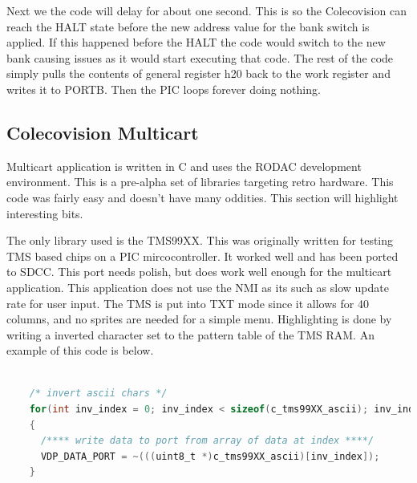\documentclass{article}
\begin{document}
  \par
  Next we the code will delay for about one second. This is so the Colecovision can reach the HALT state before the new address value for the
  bank switch is applied. If this happened before the HALT the code would switch to the new bank causing issues as it would start executing
  that code. The rest of the code simply pulls the contents of general register h20 back to the work register and writes it to PORTB. Then
  the PIC loops forever doing nothing.

  \subsection{Colecovision Multicart} \label{Colecovision Multicart}

  \par
  Multicart application is written in C and uses the RODAC development environment. This is a pre-alpha set of libraries targeting retro hardware.
  This code was fairly easy and doesn't have many oddities. This section will highlight interesting bits.

  \par
  The only library used is the TMS99XX. This was originally written for testing TMS based chips on a PIC mircocontroller. It worked well and has been
  ported to SDCC. This port needs polish, but does work well enough for the multicart application. This application does not use the NMI as its such
  as slow update rate for user input. The TMS is put into TXT mode since it allows for 40 columns, and no sprites are needed for a simple menu.
  Highlighting is done by writing a inverted character set to the pattern table of the TMS RAM. An example of this code is below.

  \begin{lstlisting}[language=C]

    /* invert ascii chars */
    for(int inv_index = 0; inv_index < sizeof(c_tms99XX_ascii); inv_index++)
    {
      /**** write data to port from array of data at index ****/
      VDP_DATA_PORT = ~(((uint8_t *)c_tms99XX_ascii)[inv_index]);
    }
  \end{lstlisting}
\end{document}
